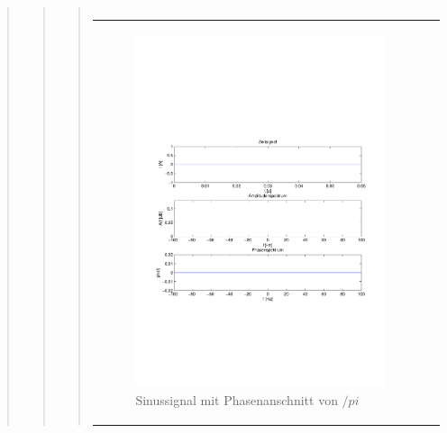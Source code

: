 \begin{quote}
\begin{quote}
\begin{quote}
\begin{center}
\begin{tabular}{ll}
                \end{tabular}
                \end{center}
                
                \begin{center}
                \begin{tabular}{ll}
    
                \hspace{-4em}
                    \begin{minipage}{0.6\textwidth}
    
                        \begin{figure}[H]
                            \label{fig:}
                            \includegraphics[scale=0.5, trim = 2cm 7cm 1.5cm 8.5cm, clip]{./Bilder/Phasenanschnitt88pi.pdf} %
                            \caption{Sinussignal mit Phasenanschnitt von $/pi$}
                        \end{figure}
    

\end{minipage}
\end{tabular}
\end{center}
\end{quote}
\end{quote}
\end{quote}
